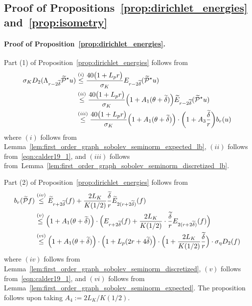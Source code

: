 \documentclass[twoside]{article}
\newcommand{\1}{\mathbf{1}}
\newcommand{\mc}[1]{\mathcal{#1}}
\newcommand{\wt}[1]{\widetilde{#1}}
\theoremstyle{definition}
\theoremstyle{remark}
\begin{document}
\subsection{Proof of Propositions~\ref{prop:dirichlet_energies} and~\ref{prop:isometry}}
\label{subsec:proof_of_prop_dirichlet_energies_and_isometry}

\paragraph{Proof of Proposition~\ref{prop:dirichlet_energies}.}
Part (1) of Proposition~\ref{prop:dirichlet_energies} follows from
\begin{align*}
\sigma_K D_2(\Lambda_{r - 2\wt{\delta}} \wt{\mc{P}}^{\star}u) & \overset{(i)}{\leq} \frac{40 \bigl(1 + L_p r\bigr)}{\sigma_K} E_{r - 2\wt{\delta}}(\wt{\mc{P}}^{\star}u) \\
& \overset{(ii)}{\leq} \frac{40 \bigl(1 + L_p r\bigr)}{\sigma_K} \Bigl(1 + A_1(\theta + \wt{\delta})\Bigr) \wt{E}_{r - 2\wt{\delta}}(\wt{\mc{P}}^{\star}u) \\
& \overset{(iii)}{\leq} \frac{40 \bigl(1 + L_p r\bigr)}{\sigma_K} \Bigl(1 + A_1(\theta + \wt{\delta})\Bigr) \cdot \biggl(1 + A_3\frac{\wt{\delta}}{r}\biggr) b_r(u)
\end{align*}
where $(i)$ follows from Lemma~\ref{lem:first_order_graph_sobolev_seminorm_expected_lb}, $(ii)$ follows from~\eqref{eqn:calder19_1}, and $(iii)$ follows from~Lemma~\ref{lem:first_order_graph_sobolev_seminorm_discretized_lb}.

Part (2) of Proposition~\ref{prop:dirichlet_energies} follows from
\begin{align*}
b_r(\wt{\mc{P}}f) & \overset{(iv)}{\leq} \wt{E}_{r + 2\wt{\delta}}(f) + \frac{2L_K}{K(1/2)}\frac{\wt{\delta}}{r}\wt{E}_{2(r + 2\wt{\delta})}(f)\\
& \overset{(v)}{\leq} \Bigl(1 + A_1(\theta + \wt{\delta})\Bigr) \cdot \Bigl({E}_{r + 2\wt{\delta}}(f) + \frac{2L_K}{K(1/2)}\cdot\frac{\wt{\delta}}{r}{E}_{2(r + 2\wt{\delta})}(f)\Bigr) \\
& \overset{(vi)}{\leq} \Bigl(1 + A_1(\theta + \wt{\delta})\Bigr) \cdot \Bigl(1 + L_p(2r + 4\wt{\delta})\Bigr) \cdot \Bigl(1 + \frac{2L_K}{K(1/2)}\frac{\wt{\delta}}{r}\Bigr) \cdot \sigma_{\eta} D_2(f)
\end{align*}
where $(iv)$ follows from Lemma~\ref{lem:first_order_graph_sobolev_seminorm_discretized}, $(v)$ follows from~\eqref{eqn:calder19_1}, and $(vi)$ follows from Lemma~\ref{lem:first_order_graph_sobolev_seminorm_expected}. The proposition follows upon taking $A_4 := 2L_K/K(1/2)$. 
\end{document}
